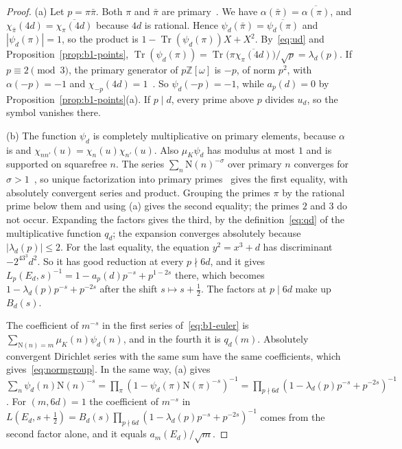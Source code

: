 \documentclass[11pt]{article}
\numberwithin{equation}{section}
\newcommand{\OO}{\mathbb Z[\omega]}
\newcommand{\N}{\mathrm N}
\newcommand{\muk}{\mu_K}
\newcommand{\Tr}{\operatorname{Tr}}
\begin{document}
\begin{proof}
(a) Let $p=\pi\bar\pi$. Both $\pi$ and $\bar\pi$ are primary~\cite[Proposition~11]{QF}. We have
$\alpha(\bar\pi)=\overline{\alpha(\pi)}$, and $\chi_{\bar\pi}(4d)=\overline{\chi_\pi(4d)}$ because $4d$ is rational.
Hence $\psi_d(\bar\pi)=\overline{\psi_d(\pi)}$ and $|\psi_d(\pi)|=1$, so the product is
$1-\Tr(\psi_d(\pi))X+X^2$. By~\eqref{eq:ud} and Proposition~\ref{prop:b1-points},
$\Tr(\psi_d(\pi))=\Tr\bigl(\pi\overline{\chi_\pi(4d)}\bigr)/\sqrt p=\lambda_d(p)$. If $p\equiv2\pmod3$, the primary
generator of $p\OO$ is $-p$, of norm $p^2$, with $\alpha(-p)=-1$ and $\chi_{-p}(4d)=1$~\cite[(3.5)]{QF}. So
$\psi_d(-p)=-1$, while $a_p(d)=0$ by Proposition~\ref{prop:b1-points}(a). If $p\mid d$, every prime above $p$ divides
$u_d$, so the symbol vanishes there.

(b) The function $\psi_d$ is completely multiplicative on primary elements, because $\alpha$ is and
$\chi_{nn'}(u)=\chi_n(u)\chi_{n'}(u)$. Also $\muk\psi_d$ has modulus at most $1$ and is supported on squarefree $n$.
The series $\sum_n\N(n)^{-\sigma}$ over primary $n$ converges for $\sigma>1$~\cite[(2.8)]{QF}, so unique
factorization into primary primes~\cite[Proposition~11]{QF} gives the first equality, with absolutely convergent
series and product. Grouping the primes $\pi$ by the rational prime below them and using (a) gives the second
equality; the primes $2$ and $3$ do not occur. Expanding the factors gives the third, by the definition~\eqref{eq:qd}
of the multiplicative function $q_d$; the expansion converges absolutely because $|\lambda_d(p)|\le2$. For the last
equality, the equation $y^2=x^3+d$ has discriminant $-2^43^3d^2$. So it has good reduction at every $p\nmid6d$, and it
gives $L_p(E_d,s)^{-1}=1-a_p(d)p^{-s}+p^{1-2s}$ there, which becomes $1-\lambda_d(p)p^{-s}+p^{-2s}$ after the shift
$s\mapsto s+\frac12$. The factors at $p\mid6d$ make up $B_d(s)$.

The coefficient of $m^{-s}$ in the first series of~\eqref{eq:b1-euler} is $\sum_{\N(n)=m}\muk(n)\psi_d(n)$, and in
the fourth it is $q_d(m)$. Absolutely convergent Dirichlet series with the same sum have the same coefficients,
which gives~\eqref{eq:normgroup}. In the same way, (a) gives
$\sum_n\psi_d(n)\N(n)^{-s}=\prod_\pi(1-\psi_d(\pi)\N(\pi)^{-s})^{-1}=\prod_{p\nmid6d}(1-\lambda_d(p)p^{-s}+p^{-2s})^{-1}$.
For $(m,6d)=1$ the coefficient of $m^{-s}$ in $L(E_d,s+\frac12)=B_d(s)\prod_{p\nmid6d}(1-\lambda_d(p)p^{-s}+p^{-2s})^{-1}$
comes from the second factor alone, and it equals $a_m(E_d)/\sqrt m$.


\end{proof}
\end{document}
